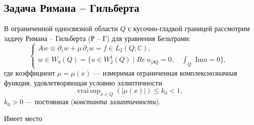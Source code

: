  \subsection{Задача Римана -- Гильберта}
 В ограниченной односвязной области $Q$ с кусочно-гладкой границей рассмотрим задачу Римана -- Гильберта (Р -- Г) для уравнения Бельтрами:
\begin{equation}\label{smm-f:1.001}
	\left\{\begin{array}{l}
		A w\equiv\partial_{\bar{z}}w+\mu\,\partial_z w=f\in L_2(Q;\mathbb{C}), \\[3mm]
		w\in W_0(Q)=\{u\in W_2^1(Q) \mid { Re\ u}_{|\partial Q}=0,\quad \int_Q\text{ Im} u=0\},
	\end{array}\right.
\end{equation}
где коэффициент $\mu=\mu(x)$ --- измеримая ограниченная комплекснозначная функция, удовлетворяющая условию эллиптичности
\begin{equation}\label{smm-f:1.2}
	\mathop{vrai\,sup}_{x\in Q}\left(|\mu(x)|\right)\leqslant k_0 <1,
\end{equation}
$k_0>0$ --- постоянная (\textit{константа эллиптичности}).

Имеет место


